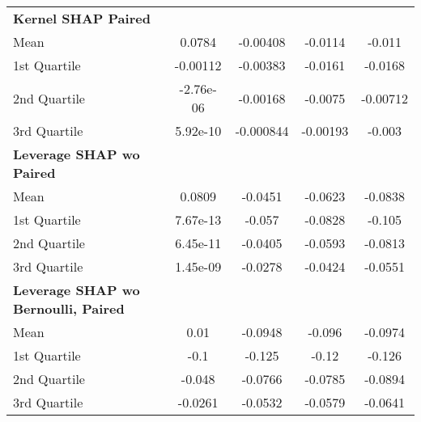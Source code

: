 {\begin{tabular} {lcccc}
\addlinespace[1ex] 
\textbf{Kernel SHAP Paired} &  &  &  &  \\ 
\hspace{7pt}Mean & \cellcolor{bronze!60}0.0784 & -0.00408 & -0.0114 & -0.011 \\ 
\hspace{7pt}1st Quartile & \cellcolor{bronze!60}-0.00112 & -0.00383 & -0.0161 & -0.0168 \\ 
\hspace{7pt}2nd Quartile & \cellcolor{bronze!60}-2.76e-06 & -0.00168 & -0.0075 & -0.00712 \\ 
\hspace{7pt}3rd Quartile & \cellcolor{bronze!60}5.92e-10 & -0.000844 & -0.00193 & -0.003 \\ 
\addlinespace[1ex] 
\textbf{Leverage SHAP wo Paired} &  &  &  &  \\ 
\hspace{7pt}Mean & 0.0809 & \cellcolor{bronze!60}-0.0451 & \cellcolor{bronze!60}-0.0623 & \cellcolor{bronze!60}-0.0838 \\ 
\hspace{7pt}1st Quartile & 7.67e-13 & \cellcolor{bronze!60}-0.057 & \cellcolor{bronze!60}-0.0828 & \cellcolor{bronze!60}-0.105 \\ 
\hspace{7pt}2nd Quartile & 6.45e-11 & \cellcolor{bronze!60}-0.0405 & \cellcolor{bronze!60}-0.0593 & \cellcolor{bronze!60}-0.0813 \\ 
\hspace{7pt}3rd Quartile & 1.45e-09 & \cellcolor{bronze!60}-0.0278 & \cellcolor{bronze!60}-0.0424 & \cellcolor{bronze!60}-0.0551 \\ 
\addlinespace[1ex] 
\textbf{Leverage SHAP wo Bernoulli, Paired} &  &  &  &  \\ 
\hspace{7pt}Mean & \cellcolor{silver!60}0.01 & \cellcolor{silver!60}-0.0948 & \cellcolor{silver!60}-0.096 & \cellcolor{silver!60}-0.0974 \\ 
\hspace{7pt}1st Quartile & \cellcolor{silver!60}-0.1 & \cellcolor{silver!60}-0.125 & \cellcolor{silver!60}-0.12 & \cellcolor{silver!60}-0.126 \\ 
\hspace{7pt}2nd Quartile & \cellcolor{silver!60}-0.048 & \cellcolor{silver!60}-0.0766 & \cellcolor{silver!60}-0.0785 & \cellcolor{silver!60}-0.0894 \\ 
\hspace{7pt}3rd Quartile & \cellcolor{silver!60}-0.0261 & \cellcolor{silver!60}-0.0532 & \cellcolor{silver!60}-0.0579 & \cellcolor{silver!60}-0.0641 \\ 
\bottomrule
\end{tabular}}